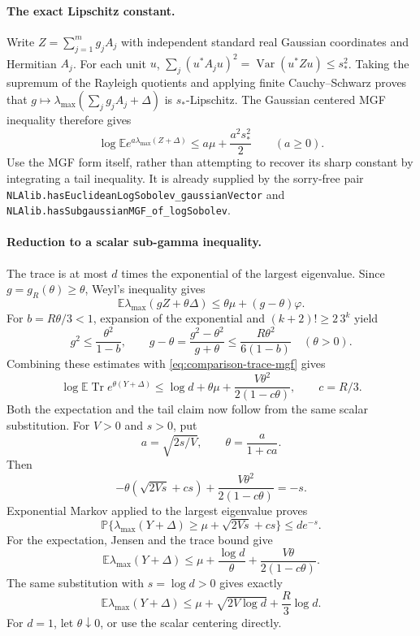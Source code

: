 \documentclass[11pt,a4paper]{article}
\DeclareRobustCommand{\code}[1]{{\footnotesize\urlstyle{tt}\nolinkurl{#1}}}
\begin{document}
\paragraph{The exact Lipschitz constant.}
Write $Z=\sum_{j=1}^m g_jA_j$ with independent standard real Gaussian
coordinates and Hermitian $A_j$.  For each unit $u$,
$\sum_j(u^*A_ju)^2=\operatorname{Var}(u^*Zu)\le s_*^2$.
Taking the supremum of the Rayleigh quotients and applying finite
Cauchy--Schwarz proves that
$g\mapsto\lambda_{\max}(\sum_jg_jA_j+\Delta)$ is $s_*$-Lipschitz.
The Gaussian centered MGF inequality therefore gives
\[
 \log\mathbb E e^{a\lambda_{\max}(Z+\Delta)}
 \le a\mu+\frac{a^2s_*^2}{2}\qquad(a\ge0).
\]
Use the MGF form itself, rather than attempting to recover its sharp
constant by integrating a tail inequality.  It is already supplied by
the sorry-free pair
\code{NLAlib.hasEuclideanLogSobolev_gaussianVector} and
\code{NLAlib.hasSubgaussianMGF_of_logSobolev}.

\paragraph{Reduction to a scalar sub-gamma inequality.}
The trace is at most $d$ times the exponential of the largest eigenvalue.
Since $g=g_R(\theta)\ge\theta$, Weyl's inequality gives
\[
 \mathbb E\lambda_{\max}(gZ+\theta\Delta)
 \le\theta\mu+(g-\theta)\varphi.
\]
For $b=R\theta/3<1$, expansion of the exponential and
$(k+2)!\ge2\,3^k$ yield
\[
 g^2\le\frac{\theta^2}{1-b},\qquad
 g-\theta=\frac{g^2-\theta^2}{g+\theta}
 \le\frac{R\theta^2}{6(1-b)}
 \quad(\theta>0).
\]
Combining these estimates with \eqref{eq:comparison-trace-mgf} gives
\begin{equation}\label{eq:comparison-subgamma}
 \log\mathbb E\operatorname{Tr}e^{\theta(Y+\Delta)}
 \le\log d+\theta\mu+
 \frac{V\theta^2}{2(1-c\theta)},\qquad c=R/3.
\end{equation}
Both the expectation and the tail claim now follow from the same scalar
substitution.  For $V>0$ and $s>0$, put
\[
 a=\sqrt{2s/V},\qquad \theta=\frac{a}{1+ca}.
\]
Then
\[
 -\theta(\sqrt{2Vs}+cs)+\frac{V\theta^2}{2(1-c\theta)}=-s.
\]
Exponential Markov applied to the largest eigenvalue proves
\[
 \mathbb P\{\lambda_{\max}(Y+\Delta)
       \ge\mu+\sqrt{2Vs}+cs\}\le de^{-s}.
\]
For the expectation, Jensen and the trace bound give
\[
 \mathbb E\lambda_{\max}(Y+\Delta)
 \le\mu+\frac{\log d}{\theta}
             +\frac{V\theta}{2(1-c\theta)}.
\]
The same substitution with $s=\log d>0$ gives exactly
\[
 \mathbb E\lambda_{\max}(Y+\Delta)
 \le\mu+\sqrt{2V\log d}+\frac R3\log d.
\]
For $d=1$, let $\theta\downarrow0$, or use the scalar centering directly.
\end{document}

